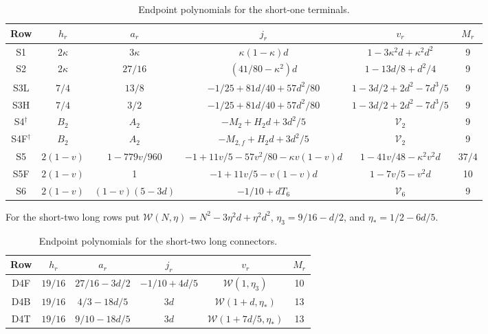 \begin{table}[htbp]\centering\small
\setlength{\tabcolsep}{4pt}
\caption{Endpoint polynomials for the short-one terminals.}
\label{tab:q117-unified:short1-data}
\begin{tabular}{@{}cccccc@{}}
\toprule
Row&\(h_r\)&\(a_r\)&\(j_r\)&\(v_r\)&\(M_r\)\\
\midrule
S1&\(2\kappa\)&\(3\kappa\)&\(\kappa(1-\kappa)d\)
 &\(1-3\kappa^2d+\kappa^2d^2\)&9\\
S2&\(2\kappa\)&\(27/16\)&\((41/80-\kappa^2)d\)
 &\(1-13d/8+d^2/4\)&9\\
S3L&\(7/4\)&\(13/8\)&\(-1/25+81d/40+57d^2/80\)
 &\(1-3d/2+2d^2-7d^3/5\)&9\\
S3H&\(7/4\)&\(3/2\)&\(-1/25+81d/40+57d^2/80\)
 &\(1-3d/2+2d^2-7d^3/5\)&9\\
S4\(^{\dagger}\)&\(B_2\)&\(A_2\)&\(-M_2+H_2d+3d^2/5\)
 &\(\mathcal V_2\)&9\\
S4F\(^{\dagger}\)&\(B_2\)&\(A_2\)&\(-M_{2,f}+H_2d+3d^2/5\)
 &\(\mathcal V_2\)&9\\
S5&\(2(1-v)\)&\(1-779v/960\)
 &\(-1+11v/5-57v^2/80-\kappa v(1-v)d\)
 &\(1-41v/48-\kappa^2v^2d\)&\(37/4\)\\
S5F&\(2(1-v)\)&1&\(-1+11v/5-v(1-v)d\)
 &\(1-7v/5-v^2d\)&10\\
S6&\(2(1-v)\)&\((1-v)(5-3d)\)&\(-1/10+dT_6\)
 &\(\mathcal V_6\)&9\\
\bottomrule
\end{tabular}
\end{table}

For the short-two long rows put
\(\mathcal W(N,\eta)=N^2-3\eta^2d+\eta^2d^2\),
\(\eta_3=9/16-d/2\), and \(\eta_*=1/2-6d/5\).
\begin{table}[htbp]\centering\small
\caption{Endpoint polynomials for the short-two long connectors.}
\label{tab:q117-unified:short2-tail-data}
\begin{tabular}{@{}cccccc@{}}
\toprule
Row&\(h_r\)&\(a_r\)&\(j_r\)&\(v_r\)&\(M_r\)\\
\midrule
D4F&\(19/16\)&\(27/16-3d/2\)&\(-1/10+4d/5\)
 &\(\mathcal W(1,\eta_3)\)&10\\
D4B&\(19/16\)&\(4/3-18d/5\)&\(3d\)
 &\(\mathcal W(1+d,\eta_*)\)&13\\
D4T&\(19/16\)&\(9/10-18d/5\)&\(3d\)
 &\(\mathcal W(1+7d/5,\eta_*)\)&13\\
\bottomrule
\end{tabular}
\end{table}


